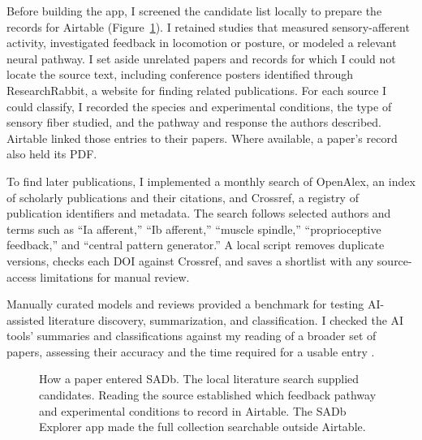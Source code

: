 Before building the app, I screened the candidate list locally to prepare the records for Airtable (Figure~\ref{fig:sadb_curation_workflow}). I retained studies that measured sensory-afferent activity, investigated feedback in locomotion or posture, or modeled a relevant neural pathway. I set aside unrelated papers and records for which I could not locate the source text, including conference posters identified through ResearchRabbit, a website for finding related publications. For each source I could classify, I recorded the species and experimental conditions, the type of sensory fiber studied, and the pathway and response the authors described. Airtable linked those entries to their papers. Where available, a paper's record also held its PDF.

To find later publications, I implemented a monthly search of OpenAlex, an index of scholarly publications and their citations, and Crossref, a registry of publication identifiers and metadata. The search follows selected authors and terms such as ``Ia afferent,'' ``Ib afferent,'' ``muscle spindle,'' ``proprioceptive feedback,'' and ``central pattern generator.'' A local script removes duplicate versions, checks each DOI against Crossref, and saves a shortlist with any source-access limitations for manual review.

Manually curated models and reviews provided a benchmark for testing AI-assisted literature discovery, summarization, and classification. I checked the AI tools' summaries and classifications against my reading of a broader set of papers, assessing their accuracy and the time required for a usable entry \citep{bolen_using_2024}.

\begin{figure}[htbp]
\centering
\usetikzlibrary{arrows.meta}
\caption{How a paper entered SADb. The local literature search supplied candidates. Reading the source established which feedback pathway and experimental conditions to record in Airtable. The SADb Explorer app made the full collection searchable outside Airtable.}
\label{fig:sadb_curation_workflow}
\end{figure}

